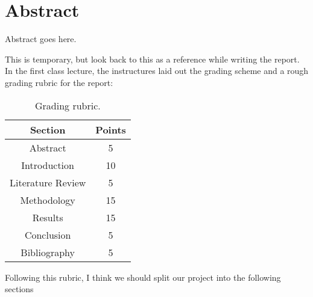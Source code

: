 \documentclass[../main.tex]{subfiles}
\begin{document}
\section*{Abstract}

Abstract goes here.

This is temporary, but look back to this as a reference while writing the report. In the first class lecture, the instructures laid out the grading scheme and a rough grading rubric for the report:

\begin{table}[h!]
    \centering
    \begin{tabular}{|c|c|}
        \hline
        \textbf{Section} & \textbf{Points} \\
        \hline
        Abstract & 5 \\
        Introduction & 10 \\
        Literature Review & 5 \\
        Methodology & 15 \\
        Results & 15 \\
        Conclusion & 5 \\
        Bibliography & 5 \\
        \hline
    \end{tabular}
    \caption{Grading rubric.}
    \label{tab:abstract:grading_rubric}
\end{table}

Following this rubric, I think we should split our project into the following sections
\end{document}
